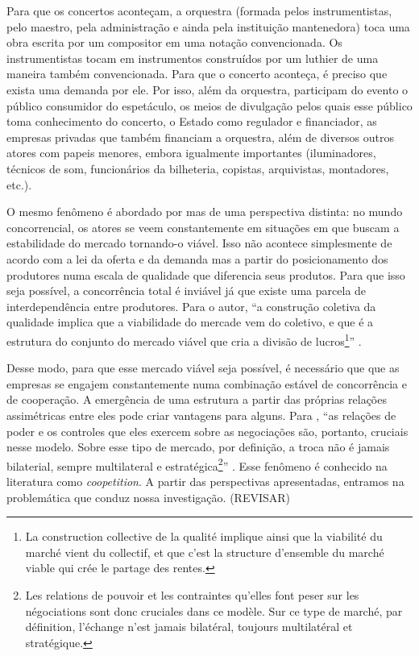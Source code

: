 \documentclass[a4paper, 12pt, openright, oneside, german, french, english, brazil]{abntex2}
\begin{document}
	Para que os concertos aconteçam, a orquestra (formada pelos instrumentistas, pelo maestro, pela administração e ainda pela instituição mantenedora) toca uma obra escrita por um compositor em uma notação convencionada. Os instrumentistas tocam em instrumentos construídos por um luthier de uma maneira também convencionada. Para que o concerto aconteça, é preciso que exista uma demanda por ele. Por isso, além da orquestra, participam do evento o público consumidor do espetáculo, os meios de divulgação pelos quais esse público toma conhecimento do concerto, o Estado como regulador e financiador, as empresas privadas que também financiam a orquestra, além de diversos outros atores com papeis menores, embora igualmente importantes (iluminadores, técnicos de som, funcionários da bilheteria, copistas, arquivistas, montadores, etc.).
	
	O mesmo fenômeno é abordado por  mas de uma perspectiva distinta: no mundo concorrencial, os atores se veem constantemente em situações em que buscam a estabilidade do mercado tornando-o viável. Isso não acontece simplesmente de acordo com a lei da oferta e da demanda mas a partir do posicionamento dos produtores numa escala de qualidade que diferencia seus produtos. Para que isso seja possível, a concorrência total é inviável já que existe uma parcela de interdependência entre produtores. Para o autor, ``a construção coletiva da qualidade implica que a viabilidade do mercade vem do coletivo, e que é a estrutura do conjunto do mercado viável que cria a divisão de lucros\footnote{La construction collective de la qualité implique ainsi que la viabilité du marché vient du collectif, et que c'est la structure d'ensemble du marché viable qui crée le partage des rentes.}'' \cite[p. 563, tradução do autor]{lazega2009theorie}. 
	
	Desse modo, para que esse mercado viável seja possível, é necessário que que as empresas se engajem constantemente numa combinação estável de concorrência e de cooperação. A emergência de uma estrutura a partir das próprias relações assimétricas entre eles pode criar vantagens para alguns. Para , ``as relações de poder e os controles que eles exercem sobre as negociações são, portanto, cruciais nesse modelo. Sobre esse tipo de mercado, por definição, a troca não é jamais bilaterial, sempre multilateral e estratégica\footnote{Les relations de pouvoir et les contraintes qu'elles font peser sur les négociations sont donc cruciales dans ce modèle. Sur ce type de marché, par définition, l'échange n'est jamais bilatéral, toujours multilatéral et stratégique.}'' \cite[p. 563, tradução do autor]{lazega2009theorie}. Esse fenômeno é conhecido na literatura como \textit{coopetition}. A partir das perspectivas apresentadas, entramos na problemática que conduz nossa investigação. (REVISAR)
	
\end{document}
